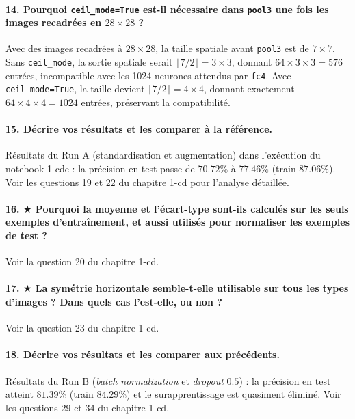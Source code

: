 \documentclass{report}
\begin{document}
\paragraph{14. Pourquoi \texttt{ceil\_mode=True} est-il nécessaire dans \texttt{pool3} une fois les images recadrées en $28 \times 28$ ?}
Avec des images recadrées à $28 \times 28$, la taille spatiale avant \texttt{pool3} est de $7 \times 7$. Sans \texttt{ceil\_mode}, la sortie spatiale serait $\lfloor 7/2 \rfloor = 3 \times 3$, donnant $64 \times 3 \times 3 = 576$ entrées, incompatible avec les 1024 neurones attendus par \texttt{fc4}. Avec \texttt{ceil\_mode=True}, la taille devient $\lceil 7/2 \rceil = 4 \times 4$, donnant exactement $64 \times 4 \times 4 = 1024$ entrées, préservant la compatibilité.

\paragraph{15. Décrire vos résultats et les comparer à la référence.}
Résultats du Run A (standardisation et augmentation) dans l'exécution du notebook 1-cde : la précision en test passe de $70.72\%$ à $77.46\%$ (train $87.06\%$). Voir les questions 19 et 22 du chapitre 1-cd pour l'analyse détaillée.

\paragraph{16. $\bigstar$ Pourquoi la moyenne et l'écart-type sont-ils calculés sur les seuls exemples d'entraînement, et aussi utilisés pour normaliser les exemples de test ?}
Voir la question 20 du chapitre 1-cd.

\paragraph{17. $\bigstar$ La symétrie horizontale semble-t-elle utilisable sur tous les types d'images ? Dans quels cas l'est-elle, ou non ?}
Voir la question 23 du chapitre 1-cd.

\paragraph{18. Décrire vos résultats et les comparer aux précédents.}
Résultats du Run B (\textit{batch normalization} et \textit{dropout} $0.5$) : la précision en test atteint $81.39\%$ (train $84.29\%$) et le surapprentissage est quasiment éliminé. Voir les questions 29 et 34 du chapitre 1-cd.
\end{document}

